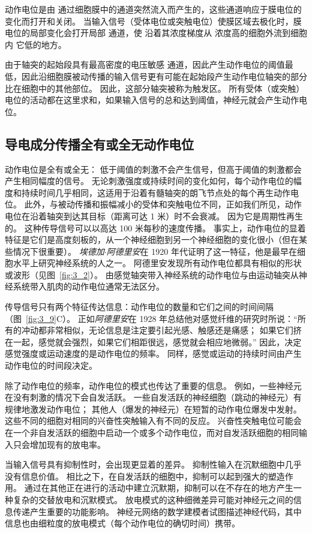 动作电位是由  通过细胞膜中的通道突然流入而产生的，这些通道响应于膜电位的变化而打开和关闭。 
当输入信号（受体电位或突触电位）使膜区域去极化时，膜电位的局部变化会打开局部  通道，使  沿着其浓度梯度从  浓度高的细胞外流到细胞内 它低的地方。


由于轴突的起始段具有最高密度的电压敏感  通道，因此产生动作电位的阈值最低，因此沿细胞膜被动传播的输入信号更有可能在起始段产生动作电位轴突的部分比在细胞中的其他部位。
因此，这部分轴突被称为触发区。
所有受体（或突触）电位的活动都在这里求和，如果输入信号的总和达到阈值，神经元就会产生动作电位。


\subsection{导电成分传播全有或全无动作电位}
动作电位是全有或全无：
低于阈值的刺激不会产生信号，但高于阈值的刺激都会产生相同幅度的信号。
无论刺激强度或持续时间的变化如何，每个动作电位的幅度和持续时间几乎相同，这适用于沿着有髓轴突的朗飞节点处的每个再生动作电位。
此外，与被动传播和振幅减小的受体和突触电位不同，正如我们所见，动作电位在沿着轴突到达其目标（距离可达 1 米）时不会衰减。 
因为它是周期性再生的。
这种传导信号可以以高达 100 米每秒的速度传播。 
事实上，动作电位的显着特征是它们是高度刻板的，从一个神经细胞到另一个神经细胞的变化很小（但在某些情况下很重要）。 
\textit{埃德加$\cdot$阿德里安}在 1920 年代证明了这一特征，他是最早在细胞水平上研究神经系统的人之一。
阿德里安发现所有动作电位都具有相似的形状或波形（见图~\ref{fig:3_2}）。
由感觉轴突带入神经系统的动作电位与由运动轴突从神经系统带入肌肉的动作电位通常无法区分。


传导信号只有两个特征传达信息：动作电位的数量和它们之间的时间间隔（图~\ref{fig:3_9}C）。 
正如\textit{阿德里安}在 1928 年总结他对感觉纤维的研究时所说：“所有的冲动都非常相似，无论信息是注定要引起光感、触感还是痛感；
如果它们挤在一起，感觉就会强烈，如果它们相距很远，感觉就会相应地微弱。” 
因此，决定感觉强度或运动速度的是动作电位的频率。
同样，感觉或运动的持续时间由产生动作电位的时间段决定。


除了动作电位的频率，动作电位的模式也传达了重要的信息。
例如，一些神经元在没有刺激的情况下会自发活跃。
一些自发活跃的神经细胞（跳动的神经元）有规律地激发动作电位；
其他人（爆发的神经元）在短暂的动作电位爆发中发射。
这些不同的细胞对相同的兴奋性突触输入有不同的反应。
兴奋性突触电位可能会在一个非自发活跃的细胞中启动一个或多个动作电位，而对自发活跃细胞的相同输入只会增加现有的放电率。


当输入信号具有抑制性时，会出现更显着的差异。
抑制性输入在沉默细胞中几乎没有信息价值。 
相比之下，在自发活跃的细胞中，抑制可以起到强大的塑造作用。
通过在其他正在进行的活动中建立沉默期，抑制可以在不存在的地方产生一种复杂的交替放电和沉默模式。
放电模式的这种细微差异可能对神经元之间的信息传递产生重要的功能影响。
神经元网络的数学建模者试图描述神经代码，其中信息也由细粒度的放电模式（每个动作电位的确切时间）携带。


